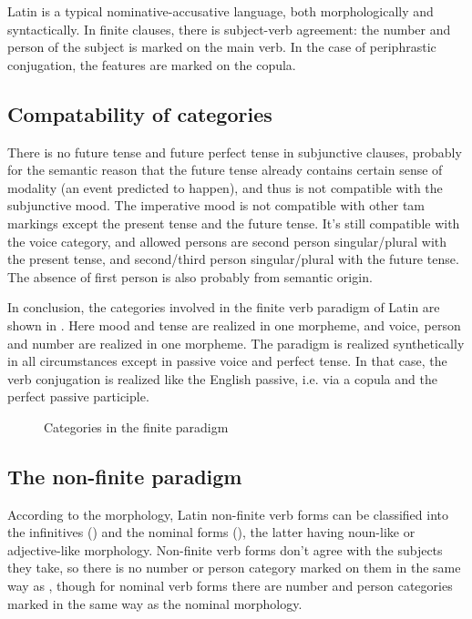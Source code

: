 \documentclass[a4paper, oneside, 12pt]{report}
\begin{document}
Latin is a typical nominative-accusative language,
both morphologically and syntactically.
In finite clauses, 
there is subject-verb agreement:
the number and person of the subject is marked on the main verb.
In the case of periphrastic conjugation,
the features are marked on the copula.

\subsection{Compatability of categories}

There is no \acl{future} tense and \acl{future perfect} tense in subjunctive clauses,
probably for the semantic reason
that the future tense already contains certain sense of modality
(an event predicted to happen),
and thus is not compatible with the \acl{subjunctive} mood.
The \acl{imperative} mood is not compatible with other \ac{tam} markings
except the \acl{present} tense and the \acl{future} tense.
It's still compatible with the voice category,
and allowed persons are 
second person singular/plural with the \acl{present} tense,
and second/third person singular/plural with the \acl{future} tense.
The absence of first person is also probably from semantic origin.

In conclusion, the categories involved in the finite verb paradigm of Latin 
are shown in .
Here mood and tense are realized in one morpheme,
and voice, person and number are realized in one morpheme.
The paradigm is realized synthetically in all circumstances 
except in passive voice and perfect tense.
In that case, the verb conjugation is realized like the English passive,
i.e. via a copula and the perfect passive participle.

\begin{figure}[H]
    \centering
    
    \caption{Categories in the finite paradigm}
    \label{fig:paradigm-finite-verb}
\end{figure}


\subsection{The non-finite paradigm}\label{sec:non-finite-abs}

According to the morphology,
Latin non-finite verb forms can be classified into the infinitives ()
and the nominal forms (),
the latter having noun-like or adjective-like morphology.
Non-finite verb forms don't agree with the subjects they take,
so there is no number or person category marked on them in the same way as ,
though for nominal verb forms there are number and person categories 
marked in the same way as the nominal morphology.
\end{document}
